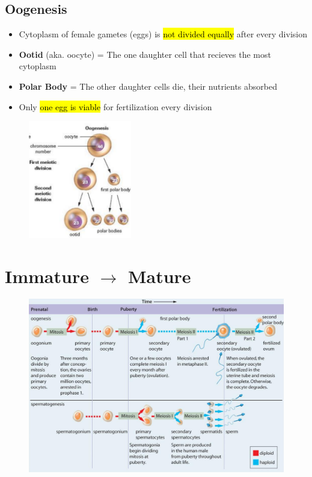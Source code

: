 \documentclass[a4paper,12pt]{article}
\begin{document}
\subsection{Oogenesis}
\begin{itemize}
    \item{Cytoplasm of female gametes (eggs) is \hl{not divided equally} after every division}
    \item{\textbf{Ootid} (aka. oocyte) = The one daughter cell that recieves the most cytoplasm}
    \item{\textbf{Polar Body} = The other daughter cells die, their nutrients absorbed}
    \item{Only \hl{one egg is viable} for fertilization every division}
\end{itemize}

\begin{figure}[H]
    \centering
    \includegraphics[width=0.4\textwidth]{oogenesis}
\end{figure}

\section{Immature $\longrightarrow$ Mature}
\begin{figure}[H]
    \centering
    \includegraphics[width=\textwidth]{genesis}
\end{figure}
\end{document}
